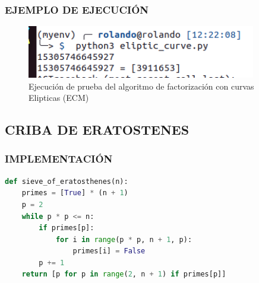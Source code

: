 
    \subsubsection{EJEMPLO DE EJECUCIÓN}
    \begin{figure}[H]
        \centering
        \includegraphics[width=10cm]{images/curva_eliptica_prueba.png}
        \caption{Ejecución de prueba del algoritmo de factorización con curvas Elipticas (ECM)}
    \end{figure}

\subsection{CRIBA DE ERATOSTENES}
\subsubsection{IMPLEMENTACIÓN}
\begin{lstlisting}[language=Python]
def sieve_of_eratosthenes(n):
    primes = [True] * (n + 1)
    p = 2
    while p * p <= n:
        if primes[p]:
            for i in range(p * p, n + 1, p):
                primes[i] = False
        p += 1
    return [p for p in range(2, n + 1) if primes[p]]
\end{lstlisting}
